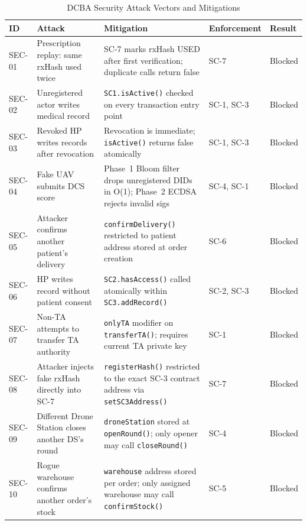 \documentclass[sigplan,screen,review=false]{acmart}
\begin{document}
\begin{table}[ht]
\centering
\caption{DCBA Security Attack Vectors and Mitigations}
\label{tab:security}
\begin{tabular}{@{}p{0.7cm}p{3.8cm}p{5cm}p{2.5cm}p{1.5cm}@{}}
\toprule
\textbf{ID} & \textbf{Attack} & \textbf{Mitigation} & \textbf{Enforcement} & \textbf{Result} \\
\midrule
SEC-01 & Prescription replay: same rxHash used twice
       & SC-7 marks rxHash USED after first verification; duplicate calls return false
       & SC-7 & Blocked \\
SEC-02 & Unregistered actor writes medical record
       & \texttt{SC1.isActive()} checked on every transaction entry point
       & SC-1, SC-3 & Blocked \\
SEC-03 & Revoked HP writes records after revocation
       & Revocation is immediate; \texttt{isActive()} returns false atomically
       & SC-1, SC-3 & Blocked \\
SEC-04 & Fake UAV submits DCS score
       & Phase~1 Bloom filter drops unregistered DIDs in O(1); Phase~2 ECDSA rejects invalid sigs
       & SC-4, SC-1 & Blocked \\
SEC-05 & Attacker confirms another patient's delivery
       & \texttt{confirmDelivery()} restricted to patient address stored at order creation
       & SC-6 & Blocked \\
SEC-06 & HP writes record without patient consent
       & \texttt{SC2.hasAccess()} called atomically within \texttt{SC3.addRecord()}
       & SC-2, SC-3 & Blocked \\
SEC-07 & Non-TA attempts to transfer TA authority
       & \texttt{onlyTA} modifier on \texttt{transferTA()}; requires current TA private key
       & SC-1 & Blocked \\
SEC-08 & Attacker injects fake rxHash directly into SC-7
       & \texttt{registerHash()} restricted to the exact SC-3 contract address via \texttt{setSC3Address()}
       & SC-7 & Blocked \\
SEC-09 & Different Drone Station closes another DS's round
       & \texttt{droneStation} stored at \texttt{openRound()}; only opener may call \texttt{closeRound()}
       & SC-4 & Blocked \\
SEC-10 & Rogue warehouse confirms another order's stock
       & \texttt{warehouse} address stored per order; only assigned warehouse may call \texttt{confirmStock()}
       & SC-5 & Blocked \\
\bottomrule
\end{tabular}
\end{table}
\end{document}

